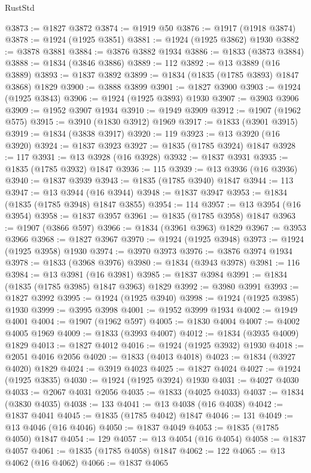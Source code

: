 \begin{lexlean}{RustStd}
\begin{coremodule}
@3873 := @1827 @3872
@3874 := @1919 @50
@3876 := @1917 (@1918 @3874)
@3878 := @1924 (@1925 @3851)
@3881 := @1924 (@1925 @3862) @1930
@3882 := @3878 @3881
@3884 := @3876 @3882 @1934
@3886 := @1833 (@3873 @3884)
@3888 := @1834 (@3846 @3886)
@3889 := 112
@3892 := @13 @3889 (@16 @3889)
@3893 := @1837 @3892
@3899 := @1834 (@1835 (@1785 @3893) @1847 @3868) @1829
@3900 := @3888 @3899
@3901 := @1827 @3900
@3903 := @1924 (@1925 @3843)
@3906 := @1924 (@1925 @3893) @1930
@3907 := @3903 @3906
@3909 := @1952 @3907 @1934
@3910 := @1949 @3909
@3912 := @1907 (@1962 @575)
@3915 := @3910 (@1830 @3912) @1969
@3917 := @1833 (@3901 @3915)
@3919 := @1834 (@3838 @3917)
@3920 := 119
@3923 := @13 @3920 (@16 @3920)
@3924 := @1837 @3923
@3927 := @1835 (@1785 @3924) @1847
@3928 := 117
@3931 := @13 @3928 (@16 @3928)
@3932 := @1837 @3931
@3935 := @1835 (@1785 @3932) @1847
@3936 := 115
@3939 := @13 @3936 (@16 @3936)
@3940 := @1837 @3939
@3943 := @1835 (@1785 @3940) @1847
@3944 := 113
@3947 := @13 @3944 (@16 @3944)
@3948 := @1837 @3947
@3953 := @1834 (@1835 (@1785 @3948) @1847 @3855)
@3954 := 114
@3957 := @13 @3954 (@16 @3954)
@3958 := @1837 @3957
@3961 := @1835 (@1785 @3958) @1847
@3963 := @1907 (@3866 @597)
@3966 := @1834 (@3961 @3963) @1829
@3967 := @3953 @3966
@3968 := @1827 @3967
@3970 := @1924 (@1925 @3948)
@3973 := @1924 (@1925 @3958) @1930
@3974 := @3970 @3973
@3976 := @3876 @3974 @1934
@3978 := @1833 (@3968 @3976)
@3980 := @1834 (@3943 @3978)
@3981 := 116
@3984 := @13 @3981 (@16 @3981)
@3985 := @1837 @3984
@3991 := @1834 (@1835 (@1785 @3985) @1847 @3963) @1829
@3992 := @3980 @3991
@3993 := @1827 @3992
@3995 := @1924 (@1925 @3940)
@3998 := @1924 (@1925 @3985) @1930
@3999 := @3995 @3998
@4001 := @1952 @3999 @1934
@4002 := @1949 @4001
@4004 := @1907 (@1962 @597)
@4005 := @1830 @4004
@4007 := @4002 @4005 @1969
@4009 := @1833 (@3993 @4007)
@4012 := @1834 (@3935 @4009) @1829
@4013 := @1827 @4012
@4016 := @1924 (@1925 @3932) @1930
@4018 := @2051 @4016 @2056
@4020 := @1833 (@4013 @4018)
@4023 := @1834 (@3927 @4020) @1829
@4024 := @3919 @4023
@4025 := @1827 @4024
@4027 := @1924 (@1925 @3835)
@4030 := @1924 (@1925 @3924) @1930
@4031 := @4027 @4030
@4033 := @2067 @4031 @2056
@4035 := @1833 (@4025 @4033)
@4037 := @1834 (@3830 @4035)
@4038 := 133
@4041 := @13 @4038 (@16 @4038)
@4042 := @1837 @4041
@4045 := @1835 (@1785 @4042) @1847
@4046 := 131
@4049 := @13 @4046 (@16 @4046)
@4050 := @1837 @4049
@4053 := @1835 (@1785 @4050) @1847
@4054 := 129
@4057 := @13 @4054 (@16 @4054)
@4058 := @1837 @4057
@4061 := @1835 (@1785 @4058) @1847
@4062 := 122
@4065 := @13 @4062 (@16 @4062)
@4066 := @1837 @4065

\end{coremodule}
\end{lexlean}

